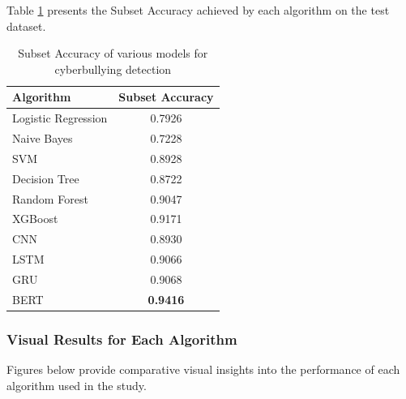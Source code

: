 \documentclass[pdflatex,sn-mathphys-num]{sn-jnl}%
\theoremstyle{thmstyleone}%
\theoremstyle{thmstyletwo}%
\theoremstyle{thmstylethree}%
\begin{document}
Table \ref{tab:subset_accuracy} presents the Subset Accuracy achieved by each algorithm on the test dataset.

\begin{table}[h!]
\centering
\begin{tabular}{|l|c|}
\hline
\textbf{Algorithm} & \textbf{Subset Accuracy} \\
\hline
Logistic Regression & 0.7926 \\
Naive Bayes         & 0.7228 \\
SVM                 & 0.8928 \\
Decision Tree       & 0.8722 \\
Random Forest       & 0.9047 \\
XGBoost             & 0.9171 \\
CNN                 & 0.8930 \\
LSTM                & 0.9066 \\
GRU                 & 0.9068 \\
BERT                & \textbf{0.9416} \\
\hline
\end{tabular}
\caption{Subset Accuracy of various models for cyberbullying detection}
\label{tab:subset_accuracy}
\end{table}


\subsubsection{Visual Results for Each Algorithm}
Figures below provide comparative visual insights into the performance of each algorithm used in the study.
\end{document}
